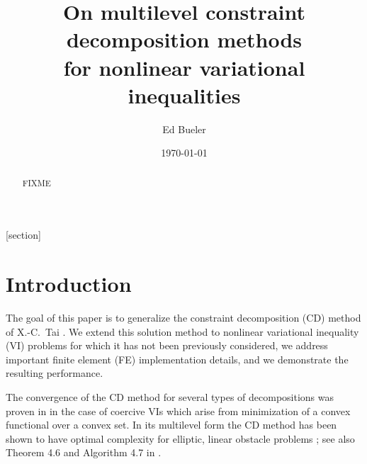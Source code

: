 \documentclass[letterpaper,final,12pt,reqno]{amsart}
\theoremstyle{cstyle}
\theoremstyle{cstyle*}
\theoremstyle{dstyle}
\numberwithin{equation}{section}
\numberwithin{figure}{section}
\numberwithin{table}{section}
\numberwithin{theorem}{section}
\begin{document}
\title[On multilevel constraint decomposition methods]{On multilevel constraint decomposition methods \\ for nonlinear variational inequalities}

\author{Ed Bueler}

\date{\today}

\begin{abstract} FIXME
\end{abstract}

\maketitle


\thispagestyle{empty}

[section]


\section{Introduction} \label{sec:intro}

The goal of this paper is to generalize the constraint decomposition (CD) method of X.-C.~Tai \cite{Tai2003}.  We extend this solution method to nonlinear variational inequality (VI) problems for which it has not been previously considered, we address important finite element (FE) implementation details, and we demonstrate the resulting performance.

The convergence of the CD method for several types of decompositions was proven in \cite{Tai2003} in the case of coercive VIs which arise from minimization of a convex functional over a convex set.  In its multilevel form the CD method has been shown to have optimal complexity for elliptic, linear obstacle problems \cite[subsection 5.4]{Tai2003}; see also Theorem 4.6 and Algorithm 4.7 in \cite{GraeserKornhuber2009}.
\end{document}
